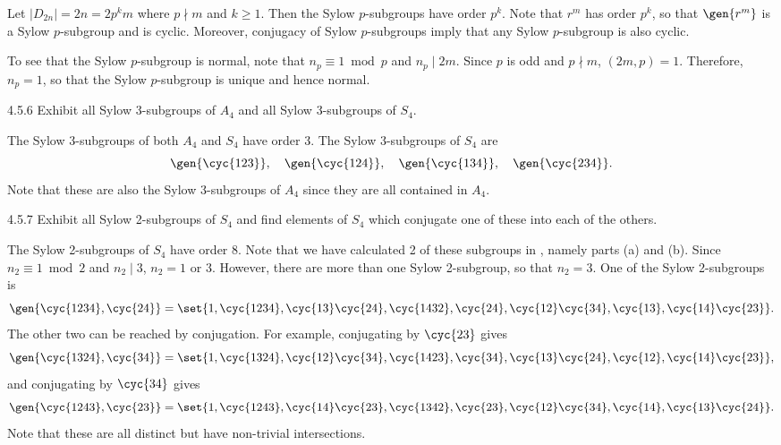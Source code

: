 \begin{sol}
	Let $|D_{2n}| = 2n = 2 p^k m$ where $p \nmid m$ and $k \geq 1$.
	Then the Sylow $p$-subgroups have order $p^k$.
	Note that $r^m$ has order $p^k$, so that $\gen{r^m}$ is a Sylow $p$-subgroup and is cyclic.
	Moreover, conjugacy of Sylow $p$-subgroups imply that any Sylow $p$-subgroup is also cyclic.

	To see that the Sylow $p$-subgroup is normal, note that $n_p \equiv 1 \bmod p$ and $n_p \mid 2m$.
	Since $p$ is odd and $p \nmid m$, $(2m, p) = 1$.
	Therefore, $n_p = 1$, so that the Sylow $p$-subgroup is unique and hence normal.
\end{sol}

\begin{exercise}{4.5.6}
	Exhibit all Sylow 3-subgroups of $A_4$ and all Sylow 3-subgroups of $S_4$.
\end{exercise}

\begin{sol}
	The Sylow 3-subgroups of both $A_4$ and $S_4$ have order 3.
	The Sylow 3-subgroups of $S_4$ are
	\[
		\gen{\cyc{1 2 3}}, \quad \gen{\cyc{1 2 4}}, \quad \gen{\cyc{1 3 4}}, \quad \gen{\cyc{2 3 4}}.
	\]
	Note that these are also the Sylow 3-subgroups of $A_4$ since they are all contained in $A_4$.
\end{sol}

\begin{exercise}{4.5.7}
	Exhibit all Sylow 2-subgroups of $S_4$ and find elements of $S_4$ which conjugate one of these into each of the others.
\end{exercise}

\begin{sol}
	The Sylow 2-subgroups of $S_4$ have order 8.
	Note that we have calculated 2 of these subgroups in , namely parts (a) and (b).
	Since $n_2 \equiv 1 \bmod 2$ and $n_2 \mid 3$, $n_2 = 1$ or $3$.
	However, there are more than one Sylow 2-subgroup, so that $n_2 = 3$.
	One of the Sylow 2-subgroups is
	\[
		\gen{\cyc{1 2 3 4}, \cyc{2 4}} = \set{1, \cyc{1 2 3 4}, \cyc{1 3}\cyc{2 4}, \cyc{1 4 3 2}, \cyc{2 4}, \cyc{1 2}\cyc{3 4}, \cyc{1 3}, \cyc{1 4}\cyc{2 3}}.
	\]
	The other two can be reached by conjugation.
	For example, conjugating by $\cyc{2 3}$ gives
	\[
		\gen{\cyc{1 3 2 4}, \cyc{3 4}} = \set{1, \cyc{1 3 2 4}, \cyc{1 2}\cyc{3 4}, \cyc{1 4 2 3}, \cyc{3 4}, \cyc{1 3}\cyc{2 4}, \cyc{1 2}, \cyc{1 4}\cyc{2 3}},
	\]
	and conjugating by $\cyc{3 4}$ gives
	\[
		\gen{\cyc{1 2 4 3}, \cyc{2 3}} = \set{1, \cyc{1 2 4 3}, \cyc{1 4}\cyc{2 3}, \cyc{1 3 4 2}, \cyc{2 3}, \cyc{1 2}\cyc{3 4}, \cyc{1 4}, \cyc{1 3}\cyc{2 4}}.
	\]
	Note that these are all distinct but have non-trivial intersections.
\end{sol}

